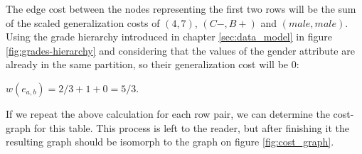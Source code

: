 The edge cost between the nodes representing the first two rows will be the sum of the scaled generalization costs of \((4, 7)\), \((C-,B+)\) and \((male, male)\). Using the grade hierarchy introduced in chapter \ref{sec:data_model} in figure \ref{fig:grades-hierarchy} and considering that the values of the gender attribute are already in the same partition, so their generalization cost will be 0:
\begin{center}
	\(w(e_{a,b})=2/3+1+0=5/3\).
\end{center}


If we repeat the above calculation for each row pair, we can determine the cost-graph for this table. This process is left to the reader, but after finishing it the resulting graph should be isomorph to the graph on figure \ref{fig:cost_graph}.

